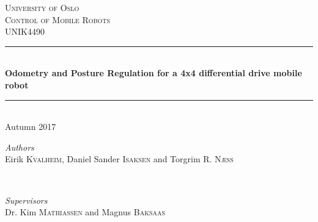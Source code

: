 \documentclass[a4paper,10pt]{article}
\begin{document}

\begin{titlepage} %
	\newcommand{\HRule}{\rule{\linewidth}{0.5mm}} %
	
	\center %
	

	
	\textsc{\LARGE University of Oslo}\\[1.5cm] %
	
	\textsc{\Large Control of Mobile Robots}\\[0.5cm] %
	
	\textsc{\large UNIK4490}\\[0.5cm] %
	
	
	\HRule\\[0.4cm]
	
	{\huge\bfseries Odometry and Posture Regulation for a 4x4 differential drive mobile robot}\\[0.4cm] %
	\HRule\\[0.8cm]
	{\large{Autumn 2017}} %
	\vspace{1cm}
	
	\begin{minipage}{0.4\textwidth}
		\begin{flushleft}
			\large
			\textit{Authors}\\
			Eirik \textsc{Kvalheim}, Daniel Sander \textsc{Isaksen} and Torgrim \textsc{R. Næss}
		\end{flushleft}
	\end{minipage}
	~
	\begin{minipage}{0.4\textwidth}
		\begin{flushright}
			\large
			\textit{Supervisors}\\
			Dr. Kim \textsc{Mathiassen} and Magnus \textsc{Baksaas}
		\end{flushright}
	\end{minipage}
	

\end{titlepage}
\end{document}
